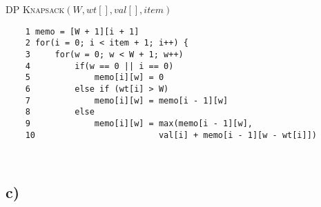 \documentclass{article}
\begin{document}
\textsc{DP Knapsack$(W, wt[], val[], item)$}

\begin{verbatim}
    1 memo = [W + 1][i + 1]
    2 for(i = 0; i < item + 1; i++) {
    3     for(w = 0; w < W + 1; w++)
    4         if(w == 0 || i == 0)
    5             memo[i][w] = 0
    6         else if (wt[i] > W)
    7             memo[i][w] = memo[i - 1][w]
    8         else
    9             memo[i][w] = max(memo[i - 1][w],
    10                         val[i] + memo[i - 1][w - wt[i]])
\end{verbatim}

\begin{verbatim}
    
\end{verbatim}

\subsection*{c)}
\end{document}
